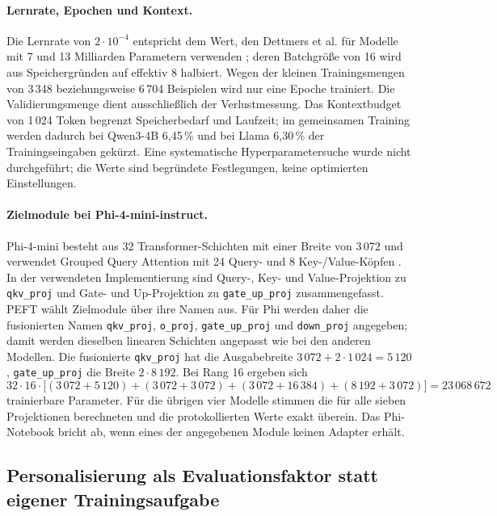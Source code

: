 \documentclass[12pt,twoside=false,a4paper,parskip]{scrbook}
\begin{document}
\paragraph{Lernrate, Epochen und Kontext.} Die Lernrate von $2\cdot10^{-4}$ entspricht dem Wert, den Dettmers et al. für Modelle mit 7 und 13 Milliarden Parametern verwenden \cite{dettmers2023qlora}; deren Batchgröße von 16 wird aus Speichergründen auf effektiv 8 halbiert. Wegen der kleinen Trainingsmengen von 3\,348 beziehungsweise 6\,704 Beispielen wird nur eine Epoche trainiert. Die Validierungsmenge dient ausschließlich der Verlustmessung. Das Kontextbudget von 1\,024 Token begrenzt Speicherbedarf und Laufzeit; im gemeinsamen Training werden dadurch bei Qwen3-4B 6{,}45\,\% und bei Llama 6{,}30\,\% der Trainingseingaben gekürzt. Eine systematische Hyperparametersuche wurde nicht durchgeführt; die Werte sind begründete Festlegungen, keine optimierten Einstellungen.

\paragraph{Zielmodule bei Phi-4-mini-instruct.} Phi-4-mini besteht aus 32 Transformer-Schichten mit einer Breite von 3\,072 und verwendet Grouped Query Attention mit 24 Query- und 8 Key-/Value-Köpfen \cite{abouelenin2025phi4mini}. In der verwendeten Implementierung sind Query-, Key- und Value-Projektion zu \texttt{qkv\_proj} und Gate- und Up-Projektion zu \texttt{gate\_up\_proj} zusammengefasst. PEFT wählt Zielmodule über ihre Namen aus. Für Phi werden daher die fusionierten Namen \texttt{qkv\_proj}, \texttt{o\_proj}, \texttt{gate\_up\_proj} und \texttt{down\_proj} angegeben; damit werden dieselben linearen Schichten angepasst wie bei den anderen Modellen. Die fusionierte \texttt{qkv\_proj} hat die Ausgabebreite $3\,072 + 2\cdot1\,024 = 5\,120$, \texttt{gate\_up\_proj} die Breite $2\cdot8\,192$. Bei Rang 16 ergeben sich
\[
32 \cdot 16 \cdot \big[(3\,072+5\,120) + (3\,072+3\,072) + (3\,072+16\,384) + (8\,192+3\,072)\big] = 23\,068\,672
\]
trainierbare Parameter. Für die übrigen vier Modelle stimmen die für alle sieben Projektionen berechneten und die protokollierten Werte exakt überein.
Das Phi-Notebook bricht ab, wenn eines der angegebenen Module keinen Adapter erhält.

\subsection{Personalisierung als Evaluationsfaktor statt eigener Trainingsaufgabe}\label{sec:personalisierung-training}
\end{document}
